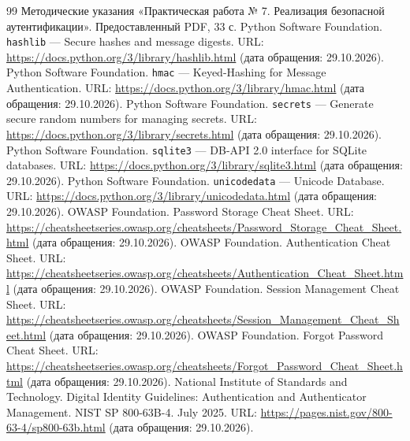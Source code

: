 \documentclass[12pt,a4paper]{article}
\begin{document}
\clearpage
\renewcommand{\refname}{Список использованных источников}
\begin{thebibliography}{99}
 Методические указания «Практическая работа № 7. Реализация безопасной аутентификации». Предоставленный PDF, 33 с.
 Python Software Foundation. \texttt{hashlib} — Secure hashes and message digests. URL: \url{https://docs.python.org/3/library/hashlib.html} (дата обращения: 29.10.2026).
 Python Software Foundation. \texttt{hmac} — Keyed-Hashing for Message Authentication. URL: \url{https://docs.python.org/3/library/hmac.html} (дата обращения: 29.10.2026).
 Python Software Foundation. \texttt{secrets} — Generate secure random numbers for managing secrets. URL: \url{https://docs.python.org/3/library/secrets.html} (дата обращения: 29.10.2026).
 Python Software Foundation. \texttt{sqlite3} — DB-API 2.0 interface for SQLite databases. URL: \url{https://docs.python.org/3/library/sqlite3.html} (дата обращения: 29.10.2026).
 Python Software Foundation. \texttt{unicodedata} — Unicode Database. URL: \url{https://docs.python.org/3/library/unicodedata.html} (дата обращения: 29.10.2026).
 OWASP Foundation. Password Storage Cheat Sheet. URL: \url{https://cheatsheetseries.owasp.org/cheatsheets/Password_Storage_Cheat_Sheet.html} (дата обращения: 29.10.2026).
 OWASP Foundation. Authentication Cheat Sheet. URL: \url{https://cheatsheetseries.owasp.org/cheatsheets/Authentication_Cheat_Sheet.html} (дата обращения: 29.10.2026).
 OWASP Foundation. Session Management Cheat Sheet. URL: \url{https://cheatsheetseries.owasp.org/cheatsheets/Session_Management_Cheat_Sheet.html} (дата обращения: 29.10.2026).
 OWASP Foundation. Forgot Password Cheat Sheet. URL: \url{https://cheatsheetseries.owasp.org/cheatsheets/Forgot_Password_Cheat_Sheet.html} (дата обращения: 29.10.2026).
 National Institute of Standards and Technology. Digital Identity Guidelines: Authentication and Authenticator Management. NIST SP 800-63B-4. July 2025. URL: \url{https://pages.nist.gov/800-63-4/sp800-63b.html} (дата обращения: 29.10.2026).
\end{thebibliography}
\end{document}
